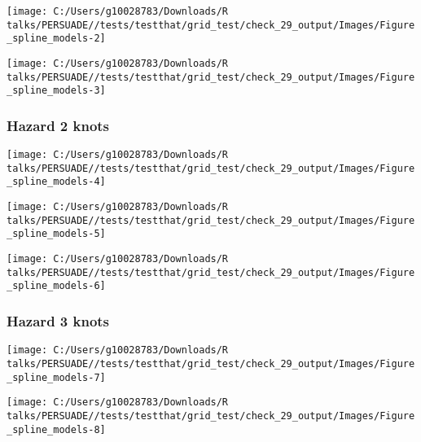 \documentclass[
]{article}
\begin{document}
\begin{flushleft}\texttt{[image: C:/Users/g10028783/Downloads/R talks/PERSUADE//tests/testthat/grid\_test/check\_29\_output/Images/Figure\_spline\_models-2]} \end{flushleft}

\begin{flushleft}\texttt{[image: C:/Users/g10028783/Downloads/R talks/PERSUADE//tests/testthat/grid\_test/check\_29\_output/Images/Figure\_spline\_models-3]} \end{flushleft}

\clearpage

\subsubsection{Hazard 2 knots}\label{hazard-2-knots}

\begin{flushleft}\texttt{[image: C:/Users/g10028783/Downloads/R talks/PERSUADE//tests/testthat/grid\_test/check\_29\_output/Images/Figure\_spline\_models-4]} \end{flushleft}

\begin{flushleft}\texttt{[image: C:/Users/g10028783/Downloads/R talks/PERSUADE//tests/testthat/grid\_test/check\_29\_output/Images/Figure\_spline\_models-5]} \end{flushleft}

\begin{flushleft}\texttt{[image: C:/Users/g10028783/Downloads/R talks/PERSUADE//tests/testthat/grid\_test/check\_29\_output/Images/Figure\_spline\_models-6]} \end{flushleft}

\clearpage

\subsubsection{Hazard 3 knots}\label{hazard-3-knots}

\begin{flushleft}\texttt{[image: C:/Users/g10028783/Downloads/R talks/PERSUADE//tests/testthat/grid\_test/check\_29\_output/Images/Figure\_spline\_models-7]} \end{flushleft}

\begin{flushleft}\texttt{[image: C:/Users/g10028783/Downloads/R talks/PERSUADE//tests/testthat/grid\_test/check\_29\_output/Images/Figure\_spline\_models-8]} \end{flushleft}
\end{document}
